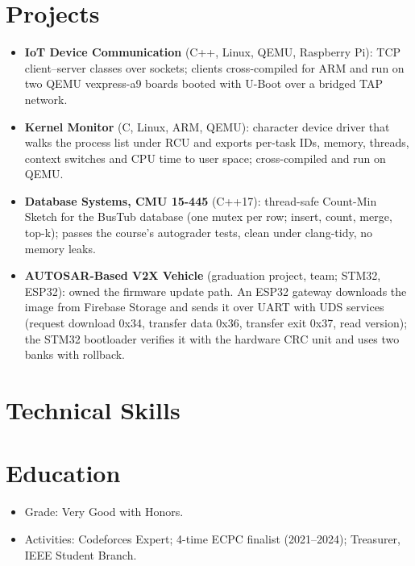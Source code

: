 \documentclass[10pt]{article}
\begin{document}
\section*{Projects}
\begin{itemize}
  \item \textbf{IoT Device Communication} (C++, Linux, QEMU, Raspberry Pi): TCP client--server classes over sockets; clients cross-compiled for ARM and run on two QEMU vexpress-a9 boards booted with U-Boot over a bridged TAP network. 
  \item \textbf{Kernel Monitor} (C, Linux, ARM, QEMU): character device driver that walks the process list under RCU and exports per-task IDs, memory, threads, context switches and CPU time to user space; cross-compiled and run on QEMU. 
  \item \textbf{Database Systems, CMU 15-445} (C++17): thread-safe Count-Min Sketch for the BusTub database (one mutex per row; insert, count, merge, top-k); passes the course's autograder tests, clean under clang-tidy, no memory leaks. 
  \item \textbf{AUTOSAR-Based V2X Vehicle} (graduation project, team; STM32, ESP32): owned the firmware update path. An ESP32 gateway downloads the image from Firebase Storage and sends it over UART with UDS services (request download 0x34, transfer data 0x36, transfer exit 0x37, read version); the STM32 bootloader verifies it with the hardware CRC unit and uses two banks with rollback. 
\end{itemize}

\section*{Technical Skills}

\section*{Education}
\begin{itemize}
  \item Grade: Very Good with Honors.
  \item Activities: Codeforces Expert; 4-time ECPC finalist (2021--2024); Treasurer, IEEE Student Branch.
\end{itemize}
\end{document}
